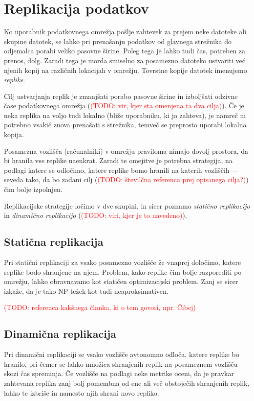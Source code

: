 \documentclass[a4paper, 12pt]{book}
\newcommand{\newterm}{\textit}
\newcommand{\TODO}[1]{\textcolor{red}{(TODO: #1)}}
\begin{document}
\section{Replikacija podatkov}

Ko uporabnik podatkovnega omrežja pošlje zahtevek za prejem neke datoteke
ali skupine datotek, se lahko pri prenašanju podatkov od glavnega strežnika
do odjemalca porabi veliko pasovne širine. Poleg tega je lahko tudi čas,
potreben za prenos, dolg. Zaradi tega je morda smiselno za posamezno
datoteko ustvariti več njenih kopij na različnih lokacijah v omrežju.
Tovrstne kopije datotek imenujemo \newterm{replike}.

Cilj ustvarjanja replik je zmanjšati porabo pasovne širine in izboljšati
odzivne čase podatkovnega omrežja (\TODO{vir, kjer sta omenjena ta dva
cilja}). Če je neka replika na voljo tudi lokalno (bliže
uporabniku, ki jo zahteva), je namreč ni potrebno vsakič znova prenašati s
strežnika, temveč se preprosto uporabi lokalna kopija.

Posamezna vozlišča (računalniki) v omrežju praviloma nimajo dovolj prostora,
da bi hranila vse replike naenkrat. Zaradi te omejitve je potrebna
strategija, na podlagi katere se odločimo, katere replike bomo hranili
na katerih vozliščih --- seveda tako, da bo zadani cilj (\TODO{številčna
referenca prej opisanega cilja?}) čim bolje izpolnjen.

Replikacijske strategije ločimo v dve skupini, in sicer poznamo
\newterm{statično replikacijo} in \newterm{dinamično replikacijo}
(\TODO{viri, kjer je to navedeno}).

\subsection{Statična replikacija}

Pri statični replikaciji za vsako posamezno vozlišče že vnaprej določimo,
katere replike bodo shranjene na njem. Problem, kako replike čim bolje
razporediti po omrežju, lahko obravnavamo kot statičen optimizacijski
problem. Zanj se sicer izkaže, da je tako NP-težek kot tudi
neaproksimativen.

\TODO{referenca kakšnega članka, ki o tem govori, npr. Čibej}

\subsection{Dinamična replikacija}

Pri dinamični replikaciji se vsako vozlišče avtonomno odloča, katere
replike bo hranilo, pri čemer se lahko množica shranjenih replik na
posameznem vozlišču skozi čas spreminja. Če vozlišče na podlagi neke
metrike oceni, da je pravkar zahtevana replika zanj bolj pomembna od ene
ali več obstoječih shranjenih replik, lahko te izbriše in namesto
njih shrani novo repliko.
\end{document}

